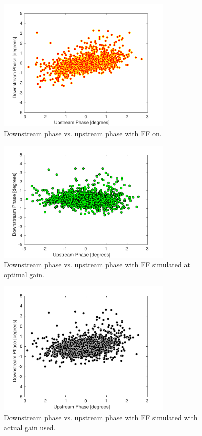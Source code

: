 \begin{figure}
  \centering
  \includegraphics[width=0.75\textwidth]{Figures/feedforward/longFF_scatterFFOn}
  \caption{Downstream phase vs. upstream phase with FF on.}
  \label{f:longFF_scatterFFOn}
\end{figure}

\begin{figure}
  \centering
  \includegraphics[width=0.75\textwidth]{Figures/feedforward/longFF_scatterFFSimOpt}
  \caption{Downstream phase vs. upstream phase with FF simulated at optimal gain.}
  \label{f:longFF_scatterFFSimOpt}
\end{figure}

\begin{figure}
  \centering
  \includegraphics[width=0.75\textwidth]{Figures/feedforward/longFF_scatterFFSimReal}
  \caption{Downstream phase vs. upstream phase with FF simulated with actual gain used.}
  \label{f:longFF_scatterFFSimReal}
\end{figure}


